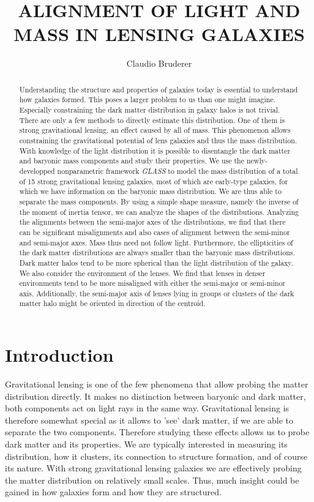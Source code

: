 \documentclass[10pt]{article}
\title{ALIGNMENT OF LIGHT AND MASS IN LENSING GALAXIES}
\author{Claudio Bruderer}
\date{}
\begin{document}
\maketitle


\begin{abstract}
\noindent Understanding the structure and properties of galaxies today is essential to understand how galaxies formed. This poses a larger problem to us than one might imagine. Especially constraining the dark matter distribution in galaxy halos is not trivial. There are only a few methods to directly estimate this distribution. One of them is strong gravitational lensing, an effect caused by all of mass. This phenomenon allows constraining the gravitational potential of lens galaxies and thus the mass distribution. With knowledge of the light distribution it is possible to disentangle the dark matter and baryonic mass components and study their properties.
We use the newly-developped nonparametric framework \textit{GLASS} to model the mass distribution of a total of 15 strong gravitational lensing galaxies, most of which are early-type galaxies, for which we have information on the baryonic mass distribution. We are thus able to separate the mass components. By using a simple shape measure, namely the inverse of the moment of inertia tensor, we can analyze the shapes of the distributions. Analyzing the alignments between the semi-major axes of the distributions, we find that there can be significant misalignments and also cases of alignment between the semi-minor and semi-major axes. Mass thus need not follow light. Furthermore, the ellipticities of the dark matter distributions are always smaller than the baryonic mass distributions. Dark matter halos tend to be more spherical than the light distribution of the galaxy. We also consider the environment of the lenses. We find that lenses in denser environments tend to be more misaligned with either the semi-major or semi-minor axis. Additionally, the semi-major axis of lenses lying in groups or clusters of the dark matter halo might be oriented in direction of the centroid.
\end{abstract}


\tableofcontents


\clearpage
\section{Introduction}\label{sec:introduction}

Gravitational lensing is one of the few phenomena that allow probing the matter distribution directly. It makes no distinction between baryonic and dark matter, both components act on light rays in the same way. Gravitational lensing is therefore somewhat special as it allows to 'see' dark matter, if we are able to separate the two components. Therefore studying these effects allows us to probe dark matter and its properties. We are typically interested in measuring its distribution, how it clusters, its connection to structure formation, and of course its nature. With strong gravitational lensing galaxies we are effectively probing the matter distribution on relatively small scales. Thus, much insight could be gained in how galaxies form and how they are structured.
\end{document}
